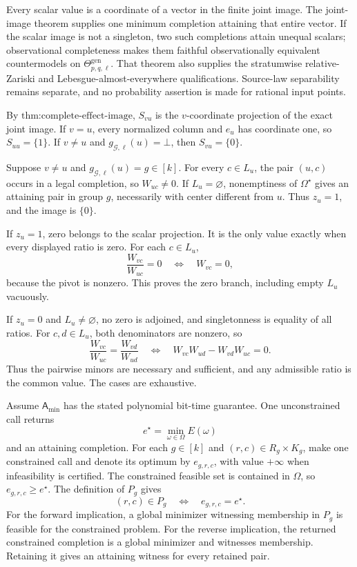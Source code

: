 Every scalar value is a coordinate of a vector in the finite joint image. The joint-image theorem supplies one minimum completion attaining that entire vector. If the scalar image is not a singleton, two such completions attain unequal scalars; observational completeness makes them faithful observationally equivalent countermodels on \(\Theta_{p,q,\ell}^{\mathrm{gen}}\). That theorem also supplies the stratumwise relative-Zariski and Lebesgue-almost-everywhere qualifications. Source-law separability remains separate, and no probability assertion is made for rational input points.

By \(\text{thm:complete-effect-image}\), \(S_{vu}\) is the \(v\)-coordinate projection of the exact joint image. If \(v=u\), every normalized column and \(e_u\) has coordinate one, so \(S_{uu}=\{1\}\). If \(v\ne u\) and \(g_{\mathcal G,\ell}(u)=\bot\), then \(S_{vu}=\{0\}\).

Suppose \(v\ne u\) and \(g_{\mathcal G,\ell}(u)=g\in[k]\). For every \(c\in L_u\), the pair \((u,c)\) occurs in a legal completion, so \(W_{uc}\ne0\). If \(L_u=\varnothing\), nonemptiness of \(\Omega^\star\) gives an attaining pair in group \(g\), necessarily with center different from \(u\). Thus \(z_u=1\), and the image is \(\{0\}\).

If \(z_u=1\), zero belongs to the scalar projection. It is the only value exactly when every displayed ratio is zero. For each \(c\in L_u\),
\[
\frac{W_{vc}}{W_{uc}}=0\quad\Longleftrightarrow\quad W_{vc}=0,
\]
because the pivot is nonzero. This proves the zero branch, including empty \(L_u\) vacuously.

If \(z_u=0\) and \(L_u\ne\varnothing\), no zero is adjoined, and singletonness is equality of all ratios. For \(c,d\in L_u\), both denominators are nonzero, so
\[
\frac{W_{vc}}{W_{uc}}=\frac{W_{vd}}{W_{ud}}
\quad\Longleftrightarrow\quad
W_{vc}W_{ud}-W_{vd}W_{uc}=0.
\]
Thus the pairwise minors are necessary and sufficient, and any admissible ratio is the common value. The cases are exhaustive.

Assume \(\mathsf A_{\min}\) has the stated polynomial bit-time guarantee. One unconstrained call returns
\[
e^\star=\min_{\omega\in\Omega}E(\omega)
\]
and an attaining completion. For each \(g\in[k]\) and \((r,c)\in R_g\times K_g\), make one constrained call and denote its optimum by \(e_{g,r,c}\), with value \(+\infty\) when infeasibility is certified. The constrained feasible set is contained in \(\Omega\), so \(e_{g,r,c}\ge e^\star\). The definition of \(P_g\) gives
\[
(r,c)\in P_g\quad\Longleftrightarrow\quad e_{g,r,c}=e^\star.
\]
For the forward implication, a global minimizer witnessing membership in \(P_g\) is feasible for the constrained problem. For the reverse implication, the returned constrained completion is a global minimizer and witnesses membership. Retaining it gives an attaining witness for every retained pair.

